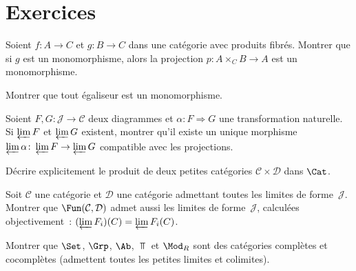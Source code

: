 \section{Exercices}\label{sec:exo-limites}

\begin{exercice}\label{exo:produit-fibre-mono}
Soient $f\colon A\to C$ et $g\colon B\to C$ dans une catégorie
avec produits fibrés. Montrer que si $g$ est un monomorphisme,
alors la projection $p\colon A\times_C B\to A$ est un monomorphisme.
\end{exercice}

\begin{exercice}\label{exo:egaliseur-mono}
Montrer que tout égaliseur est un monomorphisme.
\end{exercice}

\begin{exercice}\label{exo:limite-fonctorielle}
Soient $F,G\colon\mathcal{J}\to\mathcal{C}$ deux diagrammes et
$\alpha\colon F\Rightarrow G$ une transformation naturelle.
Si $\varprojlim F$ et $\varprojlim G$ existent, montrer qu'il
existe un unique morphisme
$\varprojlim\alpha\colon\varprojlim F\to\varprojlim G$
compatible avec les projections.
\end{exercice}

\begin{exercice}\label{exo:produit-dans-cat}
Décrire explicitement le produit de deux petites catégories
$\mathcal{C}\times\mathcal{D}$ dans $\Cat$.
\end{exercice}

\begin{exercice}\label{exo:limites-dans-foncteurs}
Soit $\mathcal{C}$ une catégorie et $\mathcal{D}$ une catégorie
admettant toutes les limites de forme~$\mathcal{J}$.
Montrer que $\Fun(\mathcal{C},\mathcal{D})$ admet aussi les limites
de forme~$\mathcal{J}$, calculées \og{}objectivement\fg{}~:
$(\varprojlim F_i)(C) = \varprojlim F_i(C)$.
\end{exercice}

\begin{exercice}\label{exo:complete-cocomplete}
Montrer que $\Set$, $\Grp$, $\Ab$, $\Top$ et $\Mod_R$
sont des catégories complètes et cocomplètes
(admettent toutes les petites limites et colimites).
\end{exercice}

